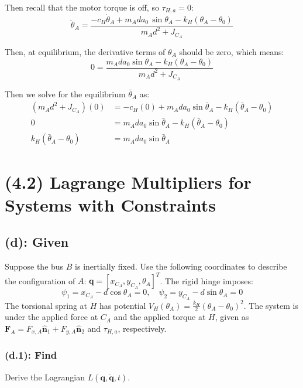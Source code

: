 \documentclass[titlepage]{article}
\begin{document}
Then recall that the motor torque is off, so $\tau_{H,a}=0$:
\begin{equation}
	\ddot{\theta}_A=\frac{-c_H\dot{\theta}_A+m_Ada_0\,\sin\theta_A-k_H\left(\theta_A-\theta_0\right)}{m_Ad^2+J_{C_A}}
\end{equation}

Then, at equilibrium, the derivative terms of $\theta_A$ should be zero, which means:
\begin{equation}
	0=\frac{m_Ada_0\sin\theta_A-k_H\left(\theta_A-\theta_0\right)}{m_Ad^2+J_{C_A}}
\end{equation}

Then we solve for the equilibrium $\bar{\theta}_A$ as:
\begin{equation}
	\begin{split}
		\left(m_Ad^2+J_{C_A}\right)(0)&=-c_H(0)+m_Ada_0\sin\bar{\theta}_A-k_H\left(\bar{\theta}_A-\theta_0\right) \\
		0&=m_Ada_0\sin\bar{\theta}_A-k_H\left(\bar{\theta}_A-\theta_0\right) \\
		k_H\left(\bar{\theta}_A-\theta_0\right)&=m_Ada_0\sin\bar{\theta}_A
	\end{split}
\end{equation}

\newpage

\section*{(4.2) Lagrange Multipliers for Systems with Constraints}

\subsection*{(d): Given}
Suppose the bus $B$ is inertially fixed. Use the following coordinates to describe the configuration of $A$: $\boldsymbol{q}=[x_{C_A},y_{C_A},\theta_A]^T$. The rigid hinge imposes:
\begin{equation}
	\psi_1=x_{C_A}-d\cos\theta_A=0,\quad\psi_2=y_{C_A}-d\sin\theta_A=0
\end{equation}
The torsional spring at $H$ has potential $V_H(\theta_A)=\frac{k_H}{2}(\theta_A-\theta_0)^2$. The system is under the applied force at $C_A$ and the applied torque at $H$, given as $\boldsymbol{F}_A=F_{x,A}\hat{\boldsymbol{n}}_1+F_{y,A}\hat{\boldsymbol{n}}_2$ and $\tau_{H,a}$, respectively.

\subsubsection*{(d.1): Find}
Derive the Lagrangian $L(\boldsymbol{q},\dot{\boldsymbol{q}},t)$.\\
\end{document}
